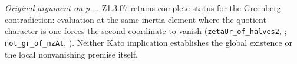 \label{r6:review:Z1.3.07} \emph{Original argument on p.~\pageref{r5:Z1.3.07}.} Z1.3.07 retains complete status for the Greenberg contradiction: evaluation at the same inertia element where the quotient character is one forces the second coordinate to vanish (\nolinkurl{zetaUr_of_halves2}, ; \nolinkurl{not_gr_of_nzAt}, ). Neither Kato implication establishes the global existence or the local nonvanishing premise itself.

